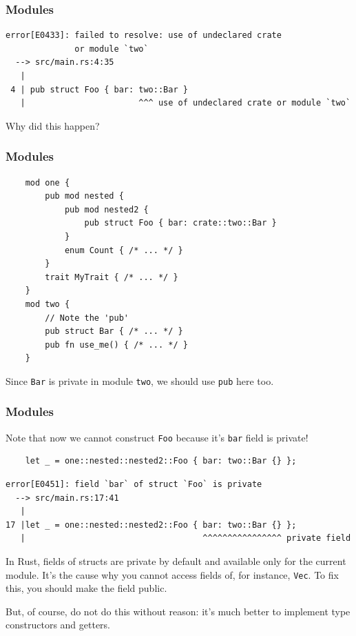\documentclass[aspectratio=1610,t]{beamer}
\begin{document}
\begin{frame}[fragile]
\frametitle{Modules}
\begin{verbatim}
error[E0433]: failed to resolve: use of undeclared crate
              or module `two`
  --> src/main.rs:4:35
   |
 4 | pub struct Foo { bar: two::Bar }
   |                       ^^^ use of undeclared crate or module `two`
\end{verbatim}

Why did this happen?

\end{frame}


\begin{frame}[fragile]
\frametitle{Modules}
\begin{verbatim}
    mod one {
        pub mod nested {
            pub mod nested2 {
                pub struct Foo { bar: crate::two::Bar }
            }
            enum Count { /* ... */ }
        }
        trait MyTrait { /* ... */ }
    }
    mod two {
        // Note the 'pub'
        pub struct Bar { /* ... */ }
        pub fn use_me() { /* ... */ }
    }
\end{verbatim}

Since \texttt{Bar} is private in module \texttt{two}, we should use \texttt{pub} here too.
\end{frame}


\begin{frame}[fragile]
\frametitle{Modules}
Note that now we cannot construct \texttt{Foo} because it's \texttt{bar} field is private!

\begin{verbatim}
    let _ = one::nested::nested2::Foo { bar: two::Bar {} };
\end{verbatim}

\begin{verbatim}
error[E0451]: field `bar` of struct `Foo` is private
  --> src/main.rs:17:41
   |
17 |let _ = one::nested::nested2::Foo { bar: two::Bar {} };
   |                                    ^^^^^^^^^^^^^^^^ private field
\end{verbatim}

In Rust, fields of structs are private by default and available only for the current module. It's the cause why you cannot access fields of, for instance, \texttt{Vec}. To fix this, you should make the field public.

But, of course, do not do this without reason: it's much better to implement type constructors and getters.
\end{frame}
\end{document}
